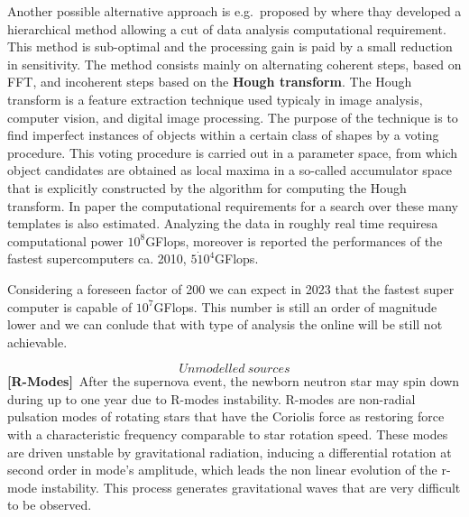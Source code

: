 

Another possible alternative approach is e.g.\ proposed by \cite{}%
where thay developed a hierarchical method
allowing a cut of  data analysis computational requirement. This method is sub-optimal and the processing gain is paid by a small
reduction in sensitivity. The method consists mainly on alternating coherent steps, based on FFT, and incoherent steps 
based on the {\bf Hough transform}. The Hough transform  is a feature extraction technique used typicaly  in image analysis, 
computer vision, and digital image processing. The purpose of the technique is to find imperfect instances of objects 
within a certain class of shapes by a voting procedure. This voting procedure is carried out in a parameter space, 
from which object candidates are obtained as local maxima in a so-called accumulator space that is explicitly 
constructed by the algorithm for computing the Hough transform.
In paper \cite{} %
 the computational requirements for a search over these many 
templates is also estimated. Analyzing the data in roughly real time requiresa computational power $10^8$GFlops, 
moreover is reported the performances of the  fastest supercomputers ca. 2010, $5\dot10^4$GFlops.

Considering a foreseen factor of 200 we can expect in 2023 that the fastest super computer is capable of $10^7$GFlops. This number is still an order of magnitude lower and we can conlude that with type of analysis the online will be still not achievable.

%

 {\bf \[  Unmodelled~sources \]}  
{\bf [R-Modes]}~After the supernova event, the newborn neutron star may spin down during up to one year due to R-modes instability. R-modes are non-radial pulsation modes of rotating stars that have the Coriolis force as restoring force with a characteristic frequency comparable to star rotation speed.
    These modes are driven unstable by gravitational radiation, inducing a differential rotation at second order in mode's amplitude, which leads the non linear evolution of the r-mode instability. This process generates gravitational waves that are very difficult to be observed.


